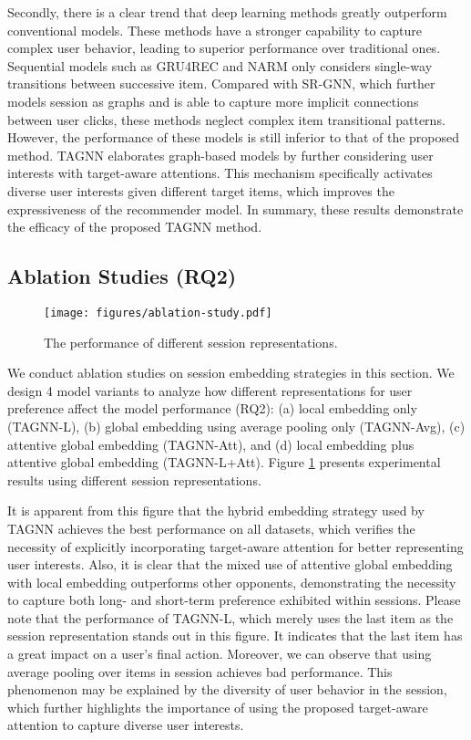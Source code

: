 \documentclass[sigconf]{acmart}
\begin{document}
Secondly, there is a clear trend that deep learning methods greatly outperform conventional models. These methods have a stronger capability to capture complex user behavior, leading to superior performance over traditional ones. Sequential models such as GRU4REC and NARM only considers single-way transitions between successive item. Compared with SR-GNN, which further models session as graphs and is able to capture more implicit connections between user clicks, these methods neglect complex item transitional patterns. However, the performance of these models is still inferior to that of the proposed method. TAGNN elaborates graph-based models by further considering user interests with target-aware attentions. This mechanism specifically activates diverse user interests given different target items, which improves the expressiveness of the recommender model. In summary, these results demonstrate the efficacy of the proposed TAGNN method.

\subsection{Ablation Studies (RQ2)}

\begin{figure}
	\centering
	\texttt{[image: figures/ablation-study.pdf]}
	\caption{The performance of different session representations.}
	\label{fig:ablation-study}
\end{figure}

We conduct ablation studies on session embedding strategies in this section. We design 4 model variants to analyze how different representations for user preference affect the model performance (RQ2): (a) local embedding only (TAGNN-L), (b) global embedding using average pooling only (TAGNN-Avg), (c) attentive global embedding (TAGNN-Att), and (d) local embedding plus attentive global embedding (TAGNN-L+Att). Figure \ref{fig:ablation-study} presents experimental results using different session representations.

It is apparent from this figure that the hybrid embedding strategy used by TAGNN achieves the best performance on all datasets, which verifies the necessity of explicitly incorporating target-aware attention for better representing user interests. Also, it is clear that the mixed use of attentive global embedding with local embedding outperforms other opponents, demonstrating the necessity to capture both long- and short-term preference exhibited within sessions. Please note that the performance of TAGNN-L, which merely uses the last item as the session representation stands out in this figure. It indicates that the last item has a great impact on a user's final action. Moreover, we can observe that using average pooling over items in session achieves bad performance. This phenomenon may be explained by the diversity of user behavior in the session, which further highlights the importance of using the proposed target-aware attention to capture diverse user interests.
\end{document}
